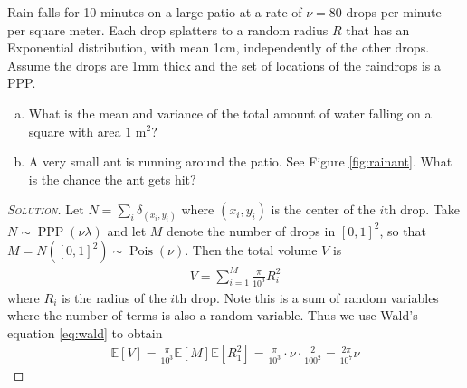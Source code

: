 \documentclass[11pt]{article}
\newenvironment{soln}{\begin{proof}[\textsc{Solution}]}{\renewcommand{\qedsymbol}{$\blacklozenge$}\end{proof}}
\begin{document}
\begin{example}\label{ex:ant}
	Rain falls for 10 minutes on a large patio at a rate of $\nu = 80$ drops per minute per square meter. Each drop splatters to a random radius $R$ that has an Exponential distribution, with mean 1cm, independently of the other drops. Assume the drops are 1mm thick and the set of locations of the raindrops is a PPP.
	\begin{enumerate}[(a)]
		\item What is the mean and variance of the total amount of water falling on a square with area $1 \text{ m}^2$?
		\item A very small ant is running around the patio. See Figure \ref{fig:rainant}. What is the chance the ant gets hit?
	\end{enumerate}

\begin{soln}
	Let $N = \sum_i \delta_{(x_i,y_i)}$ where $(x_i,y_i)$ is the center of the $i$th drop. Take $N \sim \operatorname{PPP}(\nu \lambda)$ and let $M$ denote the number of drops in $[0,1]^2$, so that $M = N([0,1]^2) \sim \operatorname{Pois}(\nu)$. Then the total volume $V$ is 
	\begin{align}
		V = \sum_{i=1}^M \frac{\pi}{10^3}R_i^2
	\end{align}
	where $R_i$ is the radius of the $i$th drop. Note this is a sum of random variables where the number of terms is also a random variable. Thus we use Wald's equation \eqref{eq:wald} to obtain
	\begin{align}\label{eq:usewald}
		\mathbb{E}\left[ V \right] = \frac{\pi}{10^3}\mathbb{E}[M]\mathbb{E}[R_1^2] = \frac{\pi}{10^3}\cdot \nu \cdot \frac{2}{100^2} = \frac{2\pi}{10^7}\nu
	\end{align}
	

\end{soln}
\end{example}
\end{document}
